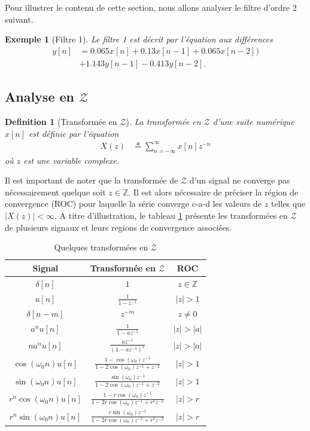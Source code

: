 \documentclass[11pt,a4paper]{IEEEtran}
\newtheorem*{exemple}{Exemple}
\newtheorem{definition}{Definition}
\begin{document}
Pour illustrer le contenu de cette section, nous allons analyser le filtre d'ordre 2 suivant.
\begin{exemple}[Filtre 1] Le filtre 1 est décrit par l'équation aux différences 
\begin{align*}
y[n]&=0.065x[n]+0.13 x[n-1]+0.065x[n-2])\\
&+1.143y[n-1]-0.413y[n-2].
\end{align*}
\end{exemple}

\subsection{Analyse en $\mathcal{Z}$}

\begin{definition}[Transformée en $\mathcal{Z}$]
La transformée en $\mathcal{Z}$ d'une suite numérique $x[n]$ est définie par l'équation
\begin{align}
X(z)&\triangleq \sum_{n=-\infty}^{\infty}x[n]z^{-n}
\end{align}
où $z$ est une variable complexe.
\end{definition}
Il est important de noter que la transformée de $\mathcal{Z}$ d'un signal ne converge pas nécessairement quelque soit $z \in \mathbb{Z}$. Il est alors nécessaire de préciser la région de convergence (ROC) pour laquelle la série converge c-a-d les valeurs de $z$ telles que $|X(z)|<\infty$. A titre d'illustration, le tableau \ref{app_tabZ} présente les transformées en $\mathcal{Z}$ de plusieurs signaux et leurs regions de convergence associées.

\begin{table}[!t]
\begin{tabular}{ccc}
Signal  & Transformée en $\mathcal{Z}$ & ROC\\
\hline
$\delta[n]$ & $1$ & $z \in \mathbb{Z}$\\
$u[n]$& $\frac{1}{1-z^{-1}}$ & $|z| > 1$\\ 
$\delta[n-m]$& $z^{-m}$ & $z \ne 0$ \\ 
$a^n u[n]$& $\frac{1}{1-az^{-1}}$ & $|z| > |a|$ \\ 
$na^n u[n]$& $\frac{az^{-1}}{(1-az^{-1})^2}$ & $|z| > |a|$ \\ 
$\cos (\omega_0 n)u[n]$& $\frac{1-\cos(\omega_0)z^{-1}}{1-2\cos(\omega_0)z^{-1}+z^{-2}}$ & $|z| > 1$ \\ 
$\sin (\omega_0 n)u[n]$& $\frac{\sin(\omega_0)z^{-1}}{1-2\cos(\omega_0)z^{-1}+z^{-2}}$ & $|z| > 1$ \\ 
$r^n\cos (\omega_0 n)u[n]$& $\frac{1-r\cos(\omega_0)z^{-1}}{1-2r\cos(\omega_0)z^{-1}+r^2z^{-2}}$ & $|z| > r$ \\ 
$r^n\sin (\omega_0 n)u[n]$& $\frac{r\sin(\omega_0)z^{-1}}{1-2r\cos(\omega_0)z^{-1}+r^2z^{-2}}$ & $|z| > r$ \\ 
\hline
\end{tabular}
\caption{Quelques transformées en $\mathcal{Z}$}\label{app_tabZ}
\end{table}
\end{document}
